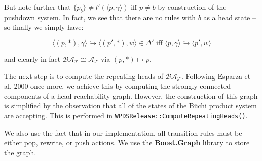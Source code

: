 \documentclass[11pt]{article}
\theoremstyle{definition}
\begin{document}
But note further that $ \{ p_b \} \neq l'(\langle p, \gamma \rangle) $ iff $ p
\neq b $ by construction of the pushdown system. In fact, we see that there are no rules with $b$ as a head state -- so finally we simply have:

\[ \langle (p, *), \gamma \rangle \hookrightarrow \langle (p', *), w\rangle \in \Delta' 
\text{ iff } \langle p, \gamma \rangle \hookrightarrow \langle p', w \rangle \]

and clearly in fact $\mathcal{BA_T} \cong \mathcal{A_T}$ via $(p, *) \mapsto p$.

The next step is to compute the repeating heads of $\mathcal{BA_T}$. Following
Esparza et al. 2000 once more, we achieve this by computing the
strongly-connected components of a head reachability graph. However, the
construction of this graph is simplified by the observation that all of the
states of the B\"{u}chi product system are accepting. This is performed in
\texttt{WPDSRelease::ComputeRepeatingHeads()}.

We also use the fact that in our implementation, all transition rules must be
either pop, rewrite, or push actions. We use the \textbf{Boost.Graph} library
to store the graph.
\end{document}
